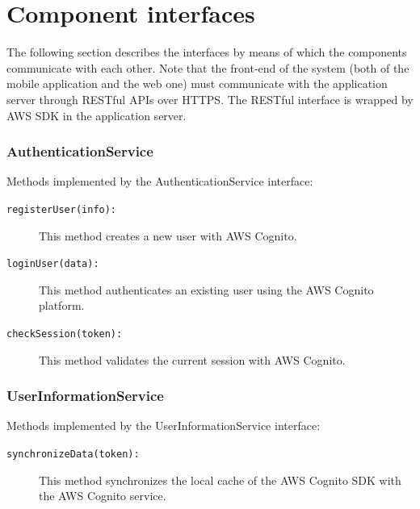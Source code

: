 \section{Component interfaces}
\label{sec:runtime_view}
The following section describes the interfaces by means of which the components communicate with each other. Note that the front-end of the system (both of the mobile application and the web one) must communicate with the application server through RESTful APIs over HTTPS. The RESTful interface is wrapped by AWS SDK in the application server.

\subsubsection*{AuthenticationService}
Methods implemented by the AuthenticationService interface:
\begin{description}
	\item[\texttt{registerUser(info):}] This method creates a new user with AWS Cognito.
	\item[\texttt{loginUser(data):}] This method authenticates an existing user using the AWS Cognito platform.
	\item[\texttt{checkSession(token):}] This method validates the current session with AWS Cognito.
\end{description}

\subsubsection*{UserInformationService}
Methods implemented by the UserInformationService interface:
\begin{description}
	\item[\texttt{synchronizeData(token):}] This method synchronizes the local cache of the AWS Cognito SDK with the AWS Cognito service.
\end{description}

